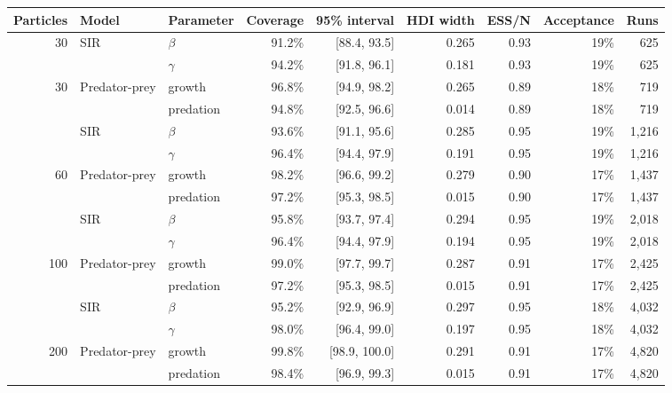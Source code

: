 \begin{tabular}{rllrrrrrr}
\toprule
Particles & Model & Parameter & Coverage & 95\% interval & HDI width & ESS/N & Acceptance & Runs \\
\midrule
30 & SIR & $\beta$ & 91.2\% & [88.4, 93.5] & 0.265 & 0.93 & 19\% & 625 \\
 &  & $\gamma$ & 94.2\% & [91.8, 96.1] & 0.181 & 0.93 & 19\% & 625 \\
30 & Predator-prey & growth & 96.8\% & [94.9, 98.2] & 0.265 & 0.89 & 18\% & 719 \\
 &  & predation & 94.8\% & [92.5, 96.6] & 0.014 & 0.89 & 18\% & 719 \\
\addlinespace
60 & SIR & $\beta$ & 93.6\% & [91.1, 95.6] & 0.285 & 0.95 & 19\% & 1,216 \\
 &  & $\gamma$ & 96.4\% & [94.4, 97.9] & 0.191 & 0.95 & 19\% & 1,216 \\
60 & Predator-prey & growth & 98.2\% & [96.6, 99.2] & 0.279 & 0.90 & 17\% & 1,437 \\
 &  & predation & 97.2\% & [95.3, 98.5] & 0.015 & 0.90 & 17\% & 1,437 \\
\addlinespace
100 & SIR & $\beta$ & 95.8\% & [93.7, 97.4] & 0.294 & 0.95 & 19\% & 2,018 \\
 &  & $\gamma$ & 96.4\% & [94.4, 97.9] & 0.194 & 0.95 & 19\% & 2,018 \\
100 & Predator-prey & growth & 99.0\% & [97.7, 99.7] & 0.287 & 0.91 & 17\% & 2,425 \\
 &  & predation & 97.2\% & [95.3, 98.5] & 0.015 & 0.91 & 17\% & 2,425 \\
\addlinespace
200 & SIR & $\beta$ & 95.2\% & [92.9, 96.9] & 0.297 & 0.95 & 18\% & 4,032 \\
 &  & $\gamma$ & 98.0\% & [96.4, 99.0] & 0.197 & 0.95 & 18\% & 4,032 \\
200 & Predator-prey & growth & 99.8\% & [98.9, 100.0] & 0.291 & 0.91 & 17\% & 4,820 \\
 &  & predation & 98.4\% & [96.9, 99.3] & 0.015 & 0.91 & 17\% & 4,820 \\
\bottomrule
\end{tabular}

